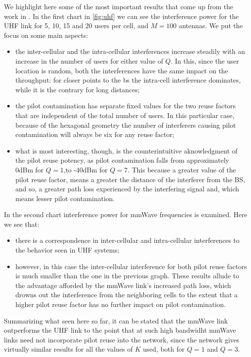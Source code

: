 \documentclass[11pt]{book}
\begin{document}
We highlight here some of the most important results that come up from the work in \cite{Ahsan2016}. In the first chart in \autoref{fig:uhf} we can see the interference power for the UHF link for 5, 10, 15 and 20 users per cell, and $M = 100$ antennas. We put the focus on some main aspects:
\begin{itemize}
  \item the inter-cellular and the intra-cellular interferences
  increase steadily with an increase in the number of users for
  either value of $Q$. In this, since the user location is random, both the interferences have the same impact on the throughput: for closer points to the \gls{bs} the intra-cell interference dominates, while it is the contrary for long distances;
  \item the pilot contamination has separate fixed values for the
  two reuse factors that are independent of the total number of users. In this particular case, because of the hexagonal geometry the number of interferers causing pilot contamination will always be six for any reuse factor;
  \item what is most interesting, though, is the counterintuitive aknowledgment of the pilot reuse potency, as pilot contamination falls from approximately 0dBm for $Q=1$,to -40dBm for $Q=7$. This because a greater value of the pilot reuse factor, means a greater the distance of the interferer from the BS, and so, a greater path loss experienced by
  the interfering signal and, which means lesser pilot contamination.
\end{itemize}
In the second chart interference power for mmWave frequencies is examined. Here we see that:
\begin{itemize}
  \item there is a correspondence in inter-cellular
and intra-cellular interferences to the behavior seen in UHF systems;
  \item however, in this case the inter-cellular interference for both pilot reuse factors is much smaller than the one in the previous graph. These results allude to the advantage afforded by the mmWave link’s increased path loss, which drowns out the interference from the neighboring cells to the extent that a higher pilot
  reuse factor has no further impact on pilot contamination.
\end{itemize}

Summarizing what seen here so far, it can be stated that the mmWave link outperforms the UHF link to the point that at such high bandwidht mmWave links need not incorporate pilot reuse into the network, since the network gives virtually similar results for all the values of $K$ used, both for $Q = 1$ and $Q=3$.
\end{document}

